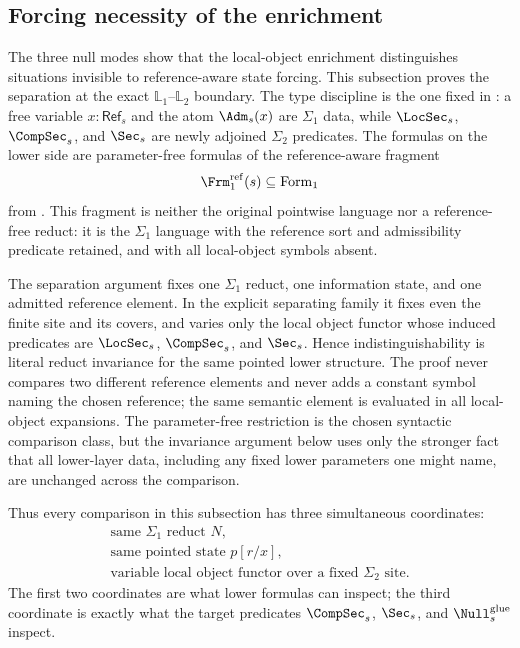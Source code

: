 \subsection{Forcing necessity of the enrichment}

The three null modes show that the local-object enrichment distinguishes situations invisible to reference-aware state forcing. This subsection proves the separation at the exact $\mathbb L_1$--$\mathbb L_2$ boundary. The type discipline is the one fixed in : a free variable $x:\mathsf{Ref}_s$ and the atom $\Adm_s(x)$ are $\Sigma_1$ data, while $\LocSec_s$, $\CompSec_s$, and $\Sec_s$ are newly adjoined $\Sigma_2$ predicates. The formulas on the lower side are parameter-free formulas of the reference-aware fragment
\[
\Frm_1^{\mathrm{ref}}(s)\subseteq \mathrm{Form}_1
\]
from . This fragment is neither the original pointwise language nor a reference-free reduct: it is the $\Sigma_1$ language with the reference sort and admissibility predicate retained, and with all local-object symbols absent.

The separation argument fixes one $\Sigma_1$ reduct, one information state, and one admitted reference element. In the explicit separating family it fixes even the finite site and its covers, and varies only the local object functor whose induced predicates are $\LocSec_s$, $\CompSec_s$, and $\Sec_s$. Hence indistinguishability is literal reduct invariance for the same pointed lower structure. The proof never compares two different reference elements and never adds a constant symbol naming the chosen reference; the same semantic element is evaluated in all local-object expansions. The parameter-free restriction is the chosen syntactic comparison class, but the invariance argument below uses only the stronger fact that all lower-layer data, including any fixed lower parameters one might name, are unchanged across the comparison.

Thus every comparison in this subsection has three simultaneous coordinates:
\[
\begin{gathered}
\text{same }\Sigma_1\text{ reduct }N,\\
\text{same pointed state }p[r/x],\\
\text{variable local object functor over a fixed }\Sigma_2\text{ site}.
\end{gathered}
\]
The first two coordinates are what lower formulas can inspect; the third coordinate is exactly what the target predicates $\CompSec_s$, $\Sec_s$, and $\Null_s^{\mathrm{glue}}$ inspect.


